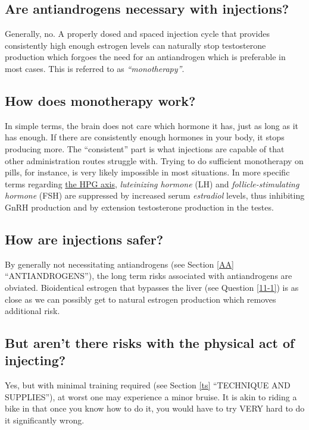 \documentclass{article}
\begin{document}
\subsection{Are antiandrogens necessary with injections?}

Generally, no. A properly dosed and spaced injection cycle that provides consistently high enough estrogen levels can naturally stop testosterone production which forgoes the need for an antiandrogen which is preferable in most cases. This is referred to as \textit{“monotherapy”}.

\subsection{How does monotherapy work?}\label{2-3}

In simple terms, the brain does not care which hormone it has, just as long as it has enough. If there are consistently enough hormones in your body, it stops producing more. The “consistent” part is what injections are capable of that other administration routes struggle with. Trying to do sufficient monotherapy on pills, for instance, is very likely impossible in most situations. In more specific terms regarding \href{https://en.wikipedia.org/wiki/Hypothalamic-pituitary-gonadal_axis}{the HPG axis}, \textit{luteinizing hormone} (LH) and \textit{follicle-stimulating hormone} (FSH) are suppressed by increased serum \textit{estradiol} levels, thus inhibiting GnRH production and by extension testosterone production in the testes.

\subsection{How are injections safer?}

By generally not necessitating antiandrogens (see Section \ref{AA} “ANTIANDROGENS”), the long term risks associated with antiandrogens are obviated. Bioidentical estrogen that bypasses the liver (see Question \ref{11-1}) is as close as we can possibly get to natural estrogen production which removes additional risk.

\subsection{But aren’t there risks with the physical act of injecting?}

Yes, but with minimal training required (see Section \ref{ts} “TECHNIQUE AND SUPPLIES”), at worst one may experience a minor bruise. It is akin to riding a bike in that once you know how to do it, you would have to try VERY hard to do it significantly wrong.
\end{document}
